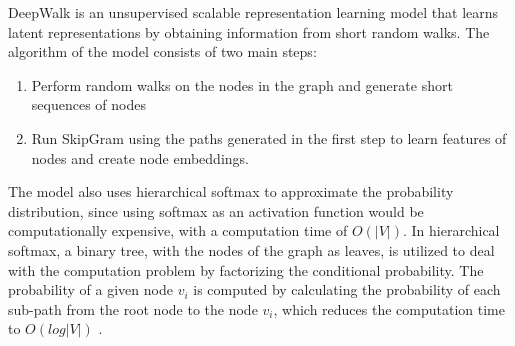 DeepWalk is an unsupervised scalable representation learning model that learns latent representations by obtaining information from short random walks. 
The algorithm of the model consists of two main steps:
\begin{enumerate}[1.]
\item Perform random walks on the nodes in the graph and generate short sequences of nodes
\item Run SkipGram using the paths generated in the first step to learn features of nodes and create node embeddings.
\end{enumerate}
The model also uses hierarchical softmax to approximate the probability distribution, since using softmax as an activation function would be computationally expensive, with a computation time of $O(|V|)$.
In hierarchical softmax, a binary tree, with the nodes of the graph as leaves, is utilized to deal with the computation problem by factorizing the conditional probability.
The probability of a given node $v_{i}$ is computed by calculating the probability of each sub-path from the root node to the node $v_{i}$, which reduces the computation time to $O(log|V|)$ \cite{perozzi_deepwalk:_2014}.
\begin{figure}[h!]
\end{figure}
